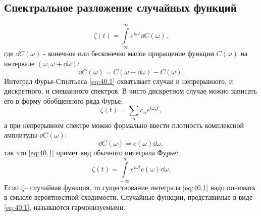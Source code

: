 \subsection{Спектральное разложение случайных функций}
\begin{equation}
	\label{eq:40.1}
	\zeta(t)= \int\limits_{\infty}^{\infty} e^{i \omega t} \dd{C(\omega)},
\end{equation}
где $\dd{C(\omega)}$ - конечное или бесконечно малое приращение функции $C(\omega)$ на интервале $(\omega, \omega+ \dd{\omega})$:
\begin{equation}
	\dd{C(\omega)}=C(\omega+\dd{\omega})-C(\omega).
\end{equation}
Интеграл Фурье-Стилтьеса \eqref{eq:40.1} охватывает случаи и непрерывного, и дискретного, и смешанного спектров. В чисто дискретном случае можно записать его в форму обобщенного ряда Фурье:
\begin{equation}
	\zeta(t)=\sum\limits_n c_n e^{i \omega_n t},
\end{equation}
а при непрерывном спектре можно формально ввести плотность комплексной амплитуды $\dd{C(\omega)}$:
\begin{equation}
	\dd{C(\omega)}= c(\omega) \dd{\omega},
\end{equation}
так что \eqref{eq:40.1} примет вид обычного интеграла Фурье:
\begin{equation}
	\zeta(t)=\int\limits_{-\infty}^{\infty} e^{i \omega t} c(\omega) \dd{\omega}.
\end{equation}
Если $\zeta$-- случайная функция, то существование интеграла \eqref{eq:40.1}
надо понимать в смысле вероятностной сходимости. Случайные функции, представимые в виде 
\eqref{eq:40.1}, называются гармонизуемыми.

